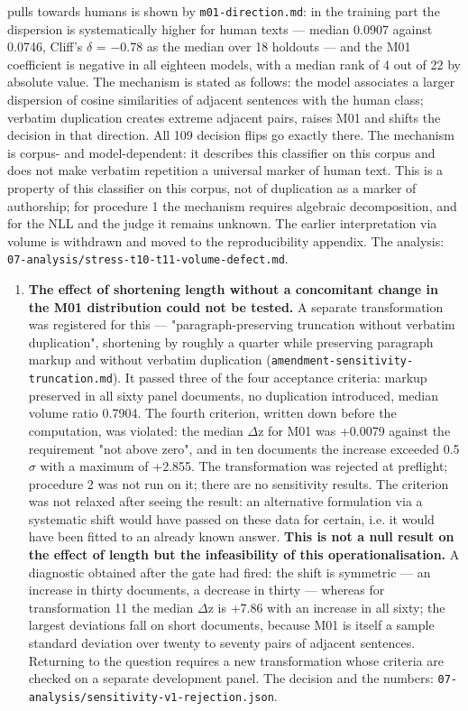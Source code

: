 \documentclass[11pt,a4paper]{article}
\renewcommand{\_}{\textunderscore\allowbreak}
\begin{document}
\begin{enumerate}
pulls towards humans is shown by \texttt{m01-\allowbreak{}direction.md}: in the training part the dispersion is systematically higher for human texts — median 0.0907 against 0.0746, Cliff's $\delta$ = $-$0.78 as the median over 18 holdouts — and the M01 coefficient is negative in all eighteen models, with a median rank of 4 out of 22 by absolute value. The mechanism is stated as follows: the model associates a larger dispersion of cosine similarities of adjacent sentences with the human class; verbatim duplication creates extreme adjacent pairs, raises M01 and shifts the decision in that direction. All 109 decision flips go exactly there. The mechanism is corpus- and model-dependent: it describes this classifier on this corpus and does not make verbatim repetition a universal marker of human text. This is a property of this classifier on this corpus, not of duplication as a marker of authorship; for procedure 1 the mechanism requires algebraic decomposition, and for the NLL and the judge it remains unknown. The earlier interpretation via volume is withdrawn and moved to the reproducibility appendix. The analysis: \texttt{07-\allowbreak{}analysis/stress-\allowbreak{}t10-\allowbreak{}t11-\allowbreak{}volume-\allowbreak{}defect.md}.
\end{enumerate}

\begin{enumerate}
\item[26.] \textbf{The effect of shortening length without a concomitant change in the M01 distribution could not be tested.} A separate transformation was registered for this — "paragraph-preserving truncation without verbatim duplication", shortening by roughly a quarter while preserving paragraph markup and without verbatim duplication (\texttt{amendment-\allowbreak{}sensitivity-\allowbreak{}truncation.md}). It passed three of the four acceptance criteria: markup preserved in all sixty panel documents, no duplication introduced, median volume ratio 0.7904. The fourth criterion, written down before the computation, was violated: the median $\Delta$z for M01 was +0.0079 against the requirement "not above zero", and in ten documents the increase exceeded 0.5 $\sigma$ with a maximum of +2.855. The transformation was rejected at preflight; procedure 2 was not run on it; there are no sensitivity results. The criterion was not relaxed after seeing the result: an alternative formulation via a systematic shift would have passed on these data for certain, i.e. it would have been fitted to an already known answer. \textbf{This is not a null result on the effect of length but the infeasibility of this operationalisation.} A diagnostic obtained after the gate had fired: the shift is symmetric — an increase in thirty documents, a decrease in thirty — whereas for transformation 11 the median $\Delta$z is +7.86 with an increase in all sixty; the largest deviations fall on short documents, because M01 is itself a sample standard deviation over twenty to seventy pairs of adjacent sentences. Returning to the question requires a new transformation whose criteria are checked on a separate development panel. The decision and the numbers: \texttt{07-\allowbreak{}analysis/sensitivity-\allowbreak{}v1-\allowbreak{}rejection.json}.
\end{enumerate}
\end{document}
